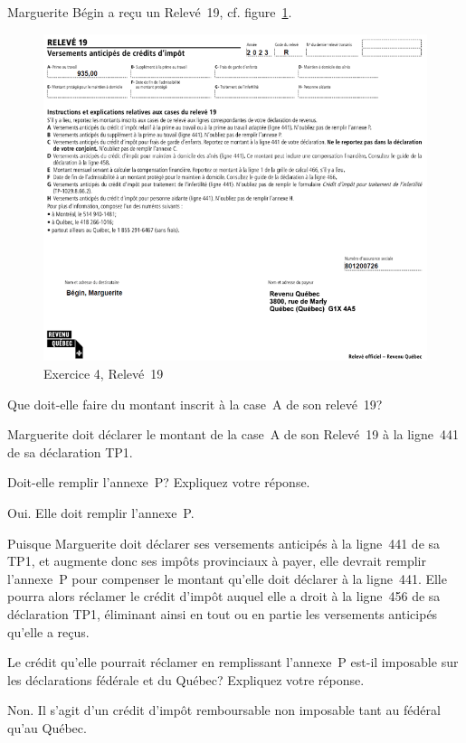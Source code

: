 \begin{question}
	Marguerite Bégin a reçu un Relevé~19, cf. figure~\ref{fig:chap7Exercice4RL19}.
	\begin{figure}
		\centering
		\includegraphics[width=.9\textwidth]{exercice/7-4/Q2/RL19.png}
		\caption[]{Exercice 4, Relevé~19}
		\label{fig:chap7Exercice4RL19}
	\end{figure}
\end{question}
\setcounter{sousQuestion}{0}
\begin{sousQuestion}
	Que doit-elle faire du montant inscrit à la case~A de son relevé~19?
\end{sousQuestion}
Marguerite doit déclarer le montant de la case~A de son Relevé~19 à la ligne~441 de sa déclaration TP1.

\begin{sousQuestion}
	Doit-elle remplir l'annexe~P? Expliquez votre réponse.
\end{sousQuestion}
Oui. Elle doit remplir l'annexe~P.

Puisque Marguerite doit déclarer ses versements anticipés à la ligne~441 de sa TP1, et augmente donc ses impôts provinciaux à payer, elle devrait remplir l'annexe~P pour compenser le montant qu'elle doit déclarer à la ligne~441. Elle pourra alors réclamer le crédit d'impôt auquel elle a droit à la ligne~456 de sa déclaration TP1, éliminant ainsi en tout ou en partie les versements anticipés qu'elle a reçus.

\begin{sousQuestion}
	Le crédit qu'elle pourrait réclamer en remplissant l'annexe~P est-il imposable sur les déclarations fédérale et du Québec? Expliquez votre réponse.
\end{sousQuestion}
Non. Il s'agit d'un crédit d'impôt remboursable non imposable tant au fédéral qu'au Québec.

